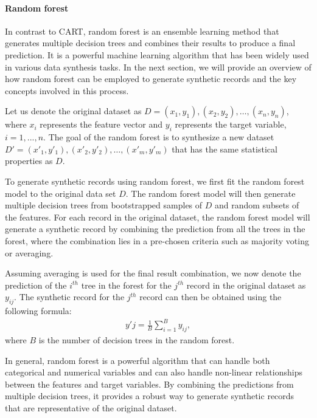 \paragraph{Random forest}
In contrast to CART, random forest \citep{rigatti2017random} is an ensemble learning method that generates multiple decision trees and combines their results to produce a final prediction. It is a powerful machine learning algorithm that has been widely used in various data synthesis tasks. In the next section, we will provide an overview of how random forest can be employed to generate synthetic records and the key concepts involved in this process.

Let us denote the original dataset as $D = { (x_1,y_1),(x_2,y_2),\dots,(x_n,y_n)}$, where $x_i$ represents the feature vector and $y_i$ represents the target variable, $i=1,...,n$. The goal of the random forest is to synthesize a new dataset $D' = { (x'_1,y'_1),(x'_2,y'_2),\dots,(x'_m,y'_m)}$ that has the same statistical properties as $D$.

To generate synthetic records using random forest, we first fit the random forest model to the original data set $D$. The random forest model will then generate multiple decision trees from bootstrapped samples of $D$ and random subsets of the features. For each record in the original dataset, the random forest model will generate a synthetic record by combining the prediction from all the trees in the forest, where the combination lies in a pre-chosen criteria such as majority voting or averaging.

Assuming averaging is used for the final result combination, we now denote the prediction of the $i^{th}$ tree in the forest for the $j^{th}$ record in the original dataset as $y_{ij}$. The synthetic record for the $j^{th}$ record can then be obtained using the following formula:
\begin{align}
\label{equ:rf}
y'j = \frac{1}{B} \sum_{i=1}^{B} y_{ij},
\end{align}
where $B$ is the number of decision trees in the random forest.

In general, random forest is a powerful algorithm that can handle both categorical and numerical variables and can also handle non-linear relationships between the features and target variables. By combining the predictions from multiple decision trees, it provides a robust way to generate synthetic records that are representative of the original dataset.



